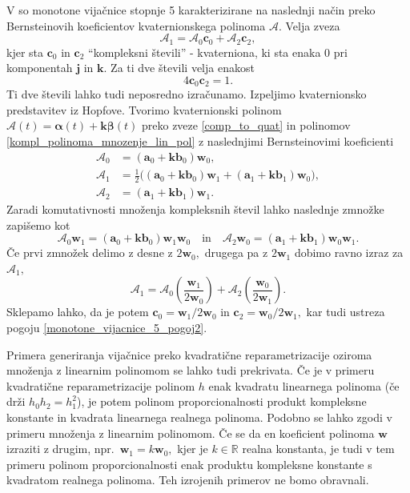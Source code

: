 \documentclass[12pt,a4paper,twoside]{article}
\theoremstyle{definition} %
\theoremstyle{plain} %
\theoremstyle{primerstyle}
\numberwithin{equation}{section}  %
\newcommand{\R}{\mathbb R}
\newcommand{\aV}{\mathbf{a}}
\newcommand{\bV}{\mathbf{b}}
\newcommand{\cV}{\mathbf{c}}
\newcommand{\jV}{\mathbf{j}}
\newcommand{\kV}{\mathbf{k}}
\newcommand{\wV}{\mathbf{w}}
\newcommand{\AQ}{\mathcal{A}}
\newcommand{\balpha}{\boldsymbol \alpha}
\newcommand{\bbeta}{\boldsymbol \beta}
\begin{document}
V \cite{faroukietal2004} so monotone vijačnice stopnje 5 karakterizirane na naslednji način preko Bernsteinovih koeficientov kvaternionskega polinoma $\AQ.$ Velja zveza
\begin{equation}
	\label{monotone_vijacnice_5_pogoj}
	\AQ_1=\AQ_0\cV_0+\AQ_2\cV_2,
\end{equation}
kjer sta $\cV_0$ in $\cV_2$ ``kompleksni števili'' - kvaterniona, ki sta enaka 0 pri komponentah $\jV$ in $\kV.$ Za ti dve števili velja enakost
\begin{equation}
	\label{monotone_vijacnice_5_pogoj2}
	4\cV_0\cV_2=1.
\end{equation}
Ti dve števili lahko tudi neposredno izračunamo. Izpeljimo kvaternionsko predstavitev iz Hopfove. Tvorimo kvaternionski polinom $\AQ(t)=\balpha(t)+\kV\bbeta(t)$ preko zveze \eqref{comp_to_quat} in polinomov \eqref{kompl_polinoma_mnozenje_lin_pol} z naslednjimi Bernsteinovimi koeficienti
\begin{align*}
	\AQ_0&=(\aV_0+\kV\bV_0)\wV_0,\\
	\AQ_1&=\frac{1}{2}\big((\aV_0+\kV\bV_0)\wV_1+(\aV_1+\kV\bV_1)\wV_0\big),\\
	\AQ_2&=(\aV_1+\kV\bV_1)\wV_1.
\end{align*}
Zaradi komutativnosti množenja kompleksnih števil lahko naslednje zmnožke zapišemo kot
\begin{equation*}
	\AQ_0\wV_1=(\aV_0+\kV\bV_0)\wV_1\wV_0\quad\text{in}\quad\AQ_2\wV_0=(\aV_1+\kV\bV_1)\wV_0\wV_1.
\end{equation*}
Če prvi zmnožek delimo z desne z $2\wV_0,$ drugega pa z $2\wV_1$ dobimo ravno izraz za $\AQ_1,$
\begin{equation*}
	\AQ_1=\AQ_0\left(\frac{\wV_1}{2\wV_0}\right)+\AQ_2\left(\frac{\wV_0}{2\wV_1}\right).
\end{equation*}
Sklepamo lahko, da je potem $\cV_0=\wV_1/2\wV_0$ in $\cV_2=\wV_0/2\wV_1,$ kar tudi ustreza pogoju \eqref{monotone_vijacnice_5_pogoj2}.

Primera generiranja vijačnice preko kvadratične reparametrizacije oziroma množenja z linearnim polinomom se lahko tudi prekrivata. Če je v primeru kvadratične reparametrizacije polinom $h$ enak kvadratu linearnega polinoma (če drži $h_0h_2=h_1^2$), je potem polinom proporcionalnosti produkt kompleksne konstante in kvadrata linearnega realnega polinoma. Podobno se lahko zgodi v primeru množenja z linearnim polinomom. Če se da en koeficient polinoma $\wV$ izraziti z drugim, npr.\ $\wV_1=k\wV_0,$ kjer je $k\in\R$ realna konstanta, je tudi v tem primeru polinom proporcionalnosti enak produktu kompleksne konstante s kvadratom realnega polinoma. Teh izrojenih primerov ne bomo obravnali.
\end{document}
